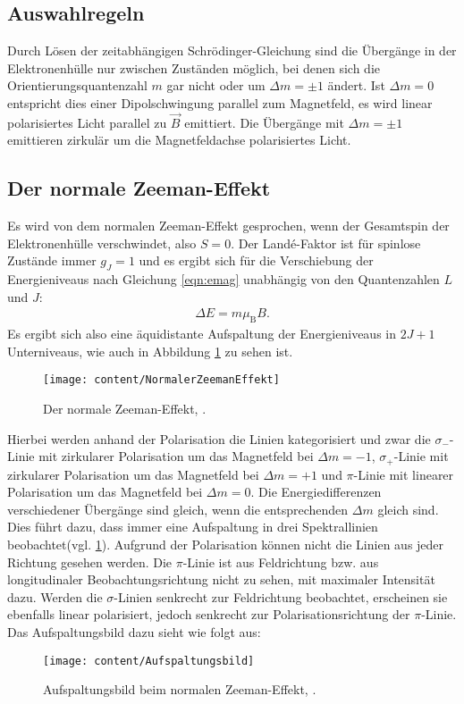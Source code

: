 \subsection{Auswahlregeln}
Durch Lösen der zeitabhängigen Schrödinger-Gleichung sind die Übergänge in der Elektronenhülle nur zwischen Zuständen möglich, bei denen sich die Orientierungsquantenzahl $m$ gar nicht oder um $\Delta m = \pm 1$ ändert. Ist $\Delta m = 0$ entspricht dies einer Dipolschwingung parallel zum Magnetfeld, es wird linear polarisiertes Licht parallel zu $\vec{B}$ emittiert. Die Übergänge mit $\Delta m = \pm 1$ emittieren zirkulär um die Magnetfeldachse polarisiertes Licht.

\subsection{Der normale Zeeman-Effekt}
Es wird von dem normalen Zeeman-Effekt gesprochen, wenn der Gesamtspin der Elektronenhülle verschwindet, also $S = 0$. Der Landé-Faktor ist für spinlose Zustände immer $g_J = 1$ und es ergibt sich für die Verschiebung der Energieniveaus nach Gleichung \ref{eqn:emag} unabhängig von den Quantenzahlen $L$ und $J$:
\begin{align}
\Delta E=m\mu_\text{B}B.
\end{align}
Es ergibt sich also eine äquidistante Aufspaltung der Energieniveaus in $2J+1$ Unterniveaus, wie auch in Abbildung \ref{fig:normalerzeemaneffekt} zu sehen ist.
\begin{figure}[h!]
	\centering
	\texttt{[image: content/NormalerZeemanEffekt]}
	\caption{Der normale Zeeman-Effekt, \cite[10]{anleitungV27}.}
	\label{fig:normalerzeemaneffekt}
\end{figure}
Hierbei werden anhand der Polarisation die Linien kategorisiert und zwar die $\sigma_-$-Linie mit zirkularer Polarisation um das Magnetfeld bei $\Delta m = -1$, $\sigma_+$-Linie mit zirkularer Polarisation um das Magnetfeld bei $\Delta m = +1$ und $\pi$-Linie mit linearer Polarisation um das Magnetfeld bei $\Delta m = 0$. Die Energiedifferenzen verschiedener Übergänge sind gleich, wenn die entsprechenden $\Delta m$ gleich sind. Dies führt dazu, dass immer eine Aufspaltung in drei Spektrallinien beobachtet(vgl. \ref{fig:normalerzeemaneffekt}).
Aufgrund der Polarisation können nicht die Linien aus jeder Richtung gesehen werden. Die $\pi$-Linie ist aus Feldrichtung bzw. aus longitudinaler Beobachtungsrichtung nicht zu sehen, mit maximaler Intensität dazu. Werden die $\sigma$-Linien senkrecht zur Feldrichtung beobachtet, erscheinen sie ebenfalls linear polarisiert, jedoch senkrecht zur Polarisationsrichtung der $\pi$-Linie. Das Aufspaltungsbild dazu sieht wie folgt aus:
\begin{figure}[h!]
	\centering
	\texttt{[image: content/Aufspaltungsbild]}
	\caption{Aufspaltungsbild beim normalen Zeeman-Effekt, \cite[10]{anleitungV27}.}
	\label{fig:aufspaltungsbild}
\end{figure}
